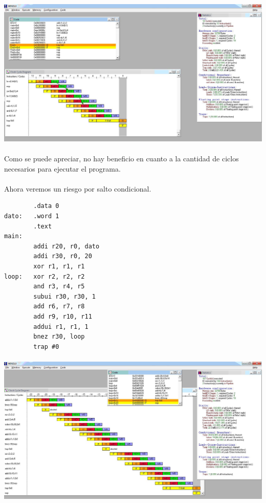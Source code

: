 \documentclass[a4paper,11pt]{article}
\begin{document}
\begin{enumerate}
\paragraph{}
\centering
\includegraphics[width=400pt]{punto5-2.JPG}

\paragraph{}
Como se puede apreciar, no hay beneficio en cuanto a la cantidad de ciclos necesarios para ejecutar el programa.

\paragraph{}
Ahora veremos un riesgo por salto condicional.

\begin{center}
\begin{verbatim}
		.data 0
dato: 	.word 1
		.text
main:
		addi r20, r0, dato
		addi r30, r0, 20
		xor r1, r1, r1
loop: 	xor r2, r2, r2
		and r3, r4, r5
		subui r30, r30, 1
		add r6, r7, r8
		add r9, r10, r11
		addui r1, r1, 1
		bnez r30, loop
		trap #0
\end{verbatim}
\end{center}

\paragraph{}
\centering
\includegraphics[width=400pt]{punto5-3.JPG}


\end{enumerate}
\end{document}

